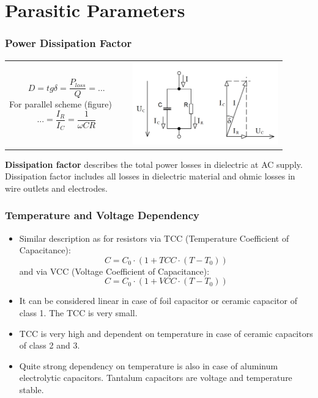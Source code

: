 \documentclass{beamer}
\begin{document}
\section{\texorpdfstring{Parasitic Parameters}{Parasitic Parameters}}
	\begin{frame}
    \frametitle{Power Dissipation Factor}
		\begin{center}
		\small
		\begin{tabular}{m{0.4\linewidth} m{0.5\linewidth}}
		$$D=tg\delta=\frac{P_{loss}}{Q}=...$$
		For parallel scheme (figure)
		$$...=\frac{I_R}{I_C}= \frac{1}{\omega CR}$$
		& \includegraphics[scale=0.2]{obr16_tgDelta.png}
		\end{tabular}
		\end{center}
		\begin{flushleft}
			\textbf{Dissipation factor} describes the total power losses in dielectric at AC supply. Dissipation factor includes all losses in dielectric material and ohmic losses in wire outlets and electrodes.
		\end{flushleft}
  \end{frame}
	\begin{frame}
    \frametitle{Temperature and Voltage Dependency}
		\small
		\begin{itemize}
			\item Similar description as for resistors via TCC (Temperature Coefficient of Capacitance): $$C= C_0\cdot\left(1+TCC\cdot(T-T_0)\right)$$ and via VCC (Voltage Coefficient of Capacitance): $$C= C_0\cdot\left(1+VCC\cdot(T-T_0)\right)$$
			\item It can be considered linear in case of foil capacitor or ceramic capacitor of class 1. The TCC is very small.
			\item TCC is very high and dependent on temperature in case of ceramic capacitors of class 2 and 3.
			\item Quite strong dependency on temperature is also in case of aluminum electrolytic capacitors. Tantalum capacitors are voltage and temperature stable.
		\end{itemize}
  \end{frame}
\end{document}

